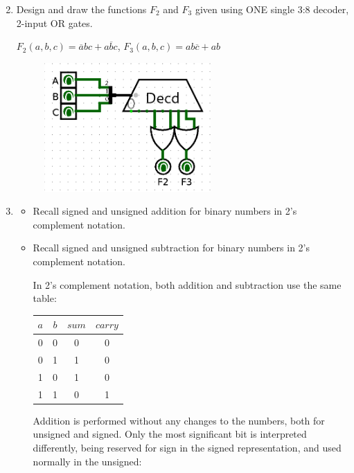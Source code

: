 \documentclass[pdftex,12pt,a4paper]{article}
\begin{document}
\begin{enumerate}[label = \arabic*.]
\setcounter{enumi}{1}
\item Design and draw the functions $F_2$ and $F_3$ given using ONE single 3:8 decoder, 2-input OR gates.	

$F_2 (a, b, c) = \overline{a}bc + a\overline{b}c$, 
$F_3 (a, b, c) = ab\overline{c} + ab$
	\begin{figure}[H]
    \centering
        \includegraphics[width=0.6\textwidth]{Prem2.png}	
        \label{fig1}
   \end{figure}	

\newpage

\item
	\begin{itemize}
		\item Recall signed and unsigned addition for binary numbers in 2’s complement notation.
		\item Recall signed and unsigned subtraction for binary numbers in 2’s complement notation.
		
		In 2's complement notation, both addition and subtraction use the same table:
\begin{minipage}{1\textwidth}
\centering
\begin{tabular}{cc|cc}
    $a$ & $b$ & $sum$ & $carry$ \\
    \hline
    0 & 0 & 0 & 0 \\
    0 & 1 & 1 & 0 \\
    1 & 0 & 1 & 0 \\
    1 & 1 & 0 & 1 \\
  \end{tabular}
\end{minipage}

Addition is performed without any changes to the numbers, both for unsigned and signed. Only the most significant bit is interpreted differently, being reserved for sign in the signed representation, and used normally in the unsigned:


\end{itemize}
\end{enumerate}
\end{document}
